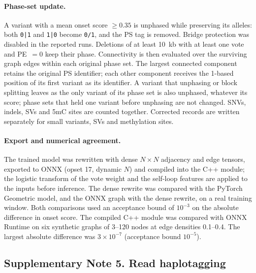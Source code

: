 \documentclass[11pt,a4paper]{article}
\newcommand{\code}[1]{\texttt{\small #1}}
\begin{document}
\paragraph{Phase-set update.} A variant with a mean onset score $\ge 0.35$ is unphased while preserving its alleles: both \code{0|1} and \code{1|0} become \code{0/1}, and the PS tag is removed. Bridge protection was disabled in the reported runs. Deletions of at least 10~kb with at least one vote and PE~$=0$ keep their phase. Connectivity is then evaluated over the surviving graph edges within each original phase set. The largest connected component retains the original PS identifier; each other component receives the 1-based position of its first variant as its identifier. A variant that unphasing or block splitting leaves as the only variant of its phase set is also unphased, whatever its score; phase sets that held one variant before unphasing are not changed. SNVs, indels, SVs and 5mC sites are counted together. Corrected records are written separately for small variants, SVs and methylation sites.

\paragraph{Export and numerical agreement.} The trained model was rewritten with dense $N \times N$ adjacency and edge tensors, exported to ONNX (opset 17, dynamic $N$) and compiled into the C++ module; the logistic transform of the vote weight and the self-loop features are applied to the inputs before inference. The dense rewrite was compared with the PyTorch Geometric model, and the ONNX graph with the dense rewrite, on a real training window. Both comparisons used an acceptance bound of $10^{-3}$ on the absolute difference in onset score. The compiled C++ module was compared with ONNX Runtime on six synthetic graphs of 3--120 nodes at edge densities 0.1--0.4. The largest absolute difference was $3\times 10^{-7}$ (acceptance bound $10^{-5}$).

\subsection*{Supplementary Note 5. Read haplotagging}
\end{document}
